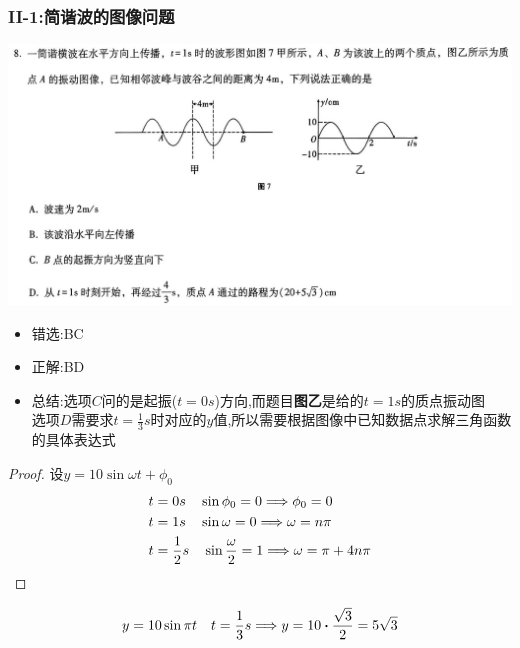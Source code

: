 \documentclass{article}
\begin{document}
\vspace{2em}

\subsubsection{II-1:简谐波的图像问题}
\includegraphics[width=50em,keepaspectratio]{./pictures/3.1-2.png}

\begin{itemize}
    \item 错选:\quad BC
    \item 正解:\quad BD
    \item 总结:\quad 选项$C$问的是起振($t=0s$)方向,而题目\textbf{图乙}是给的$t=1s$的质点振动图\\
          选项$D$需要求$t=\frac{1}{3}s$时对应的$y$值,所以需要根据图像中已知数据点求解三角函数的具体表达式
\end{itemize}

\begin{proof}
    设$ y = 10 \sin{\omega t + \phi_{0}}$
    \begin{align*}
        t & = 0s \quad \sin{\phi_{0}} = 0 \Longrightarrow \phi_{0} = 0                           \\
        t & = 1s \quad \sin{\omega} = 0 \Longrightarrow \omega = n\pi                            \\
        t & = \frac{1}{2}s \quad \sin{\frac{\omega}{2}} = 1 \Longrightarrow \omega = \pi + 4n\pi
    \end{align*}
\end{proof}
$$
    y = 10\sin{\pi t} \quad t = \frac{1}{3}s \lra y = 10 \vdot \frac{\sqrt{3}}{2} = 5\sqrt{3}
$$

\vspace{2em}
\end{document}

